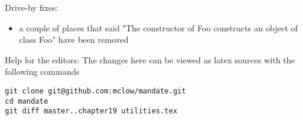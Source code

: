 %
%


Drive-by fixes:
\begin{itemize}
\item{a couple of places that said "The constructor of Foo constructs an object of class Foo" have been removed}
\end{itemize}


\vfill
Help for the editors: The changes here can be viewed as latex sources with the following commands
\begin{verbatim}
git clone git@github.com:mclow/mandate.git
cd mandate
git diff master..chapter19 utilities.tex
\end{verbatim}
\newpage
